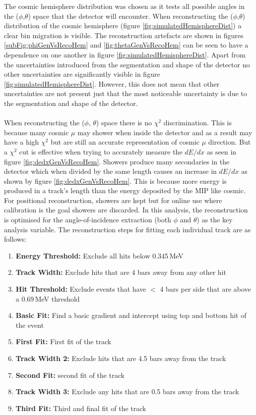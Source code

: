 The cosmic hemisphere distribution was chosen as it tests all possible angles in the ($\phi$,$\theta$) space that the detector will encounter. When reconstructing the ($\phi$,$\theta$) distribution of the cosmic hemisphere (figure \ref{fig:simulatedHemisphereDist}) a clear bin migration is visible. The reconstruction artefacts are shown in figures \ref{subFig:phiGenVsRecoHem} and \ref{fig:thetaGenVsRecoHem} can be seen to have a dependence on one another in figure \ref{fig:simulatedHemisphereDist}. Apart from the uncertainties introduced from the segmentation and shape of the detector no other uncertainties are significantly visible in figure \ref{fig:simulatedHemisphereDist}. However, this does not mean that other uncertainties are not present just that the most noticeable uncertainty is due to the segmentation and shape of the detector. 
\\\\When reconstructing the ($\phi$, $\theta$) space there is no $\chi^2$ discrimination. This is because many cosmic $\mu$ may shower when inside the detector and as a result may have a high $\chi^2$ but are still an accurate representation of cosmic $\mu$ direction. But a $\chi^2$ cut is effective when trying to accurately measure the $dE/dx$ as seen in figure \ref{fig:dedxGenVsRecoHem}. Showers produce many secondaries in the detector which when divided by the same length causes an increase in $dE/dx$ as shown by figure \ref{fig:dedxGenVsRecoHem}. This is because more energy is produced in a track's length than the energy deposited by the MIP like cosmic. For positional reconstruction, showers are kept but for online use where calibration is the goal showers are discarded. In this analysis, the reconstruction is optimised for the angle-of-incidence extraction (both $\phi$ and $\theta$) as the key analysis variable. The reconstruction steps for fitting each individual track are as follows: 
\begin{enumerate}
  \item \textbf{Energy Threshold:} Exclude all hits below 0.345\,MeV
  \item \textbf{Track Width:} Exclude hits that are 4 bars away from any other hit 
  \item \textbf{Hit Threshold:} Exclude events that have $<$ 4 bars per side that are above a 0.69\,MeV threshold
  \item \textbf{Basic Fit:} Find a basic gradient and intercept using top and bottom hit of the event
  \item \textbf{First Fit:} First fit of the track 
  \item \textbf{Track Width 2:} Exclude hits that are 4.5 bars away from the track
  \item \textbf{Second Fit:} second fit of the track
  \item \textbf{Track Width 3:} Exclude any hits that are 0.5 bars away from the track
  \item \textbf{Third Fit:} Third and final fit of the track
\end{enumerate}

